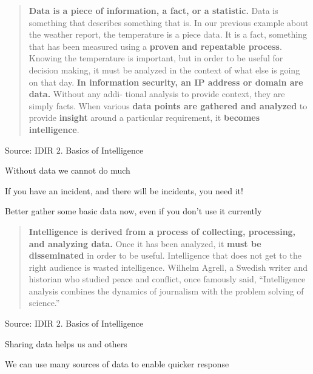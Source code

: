 \documentclass[Screen16to9,17pt]{foils}
\begin{document}

\begin{quote}{\bf
Data is a piece of information, a fact, or a statistic.} Data is something that describes
something that is. In our previous example about the weather report, the temperature
is a piece data. It is a fact, something that has been measured using a {\bf proven and
repeatable process}. Knowing the temperature is important, but in order to be useful
for decision making, it must be analyzed in the context of what else is going on that
day. {\bf In information security, an IP address or domain are data.} Without any addi‐
tional analysis to provide context, they are simply facts. When various {\bf data points are
gathered and analyzed} to provide {\bf insight} around a particular requirement, it {\bf becomes
intelligence}.
\end{quote}
Source:  IDIR 2. Basics of Intelligence

\begin{list2}
\item Without data we cannot do much
\item If you have an incident, and there will be incidents, you need it!
\item Better gather some basic data now, even if you don't use it currently
\end{list2}

\slide{}


\begin{quote}{\bf
Intelligence is derived from a process of collecting, processing, and analyzing data.}
Once it has been analyzed, it {\bf must be disseminated} in order to be useful. Intelligence
that does not get to the right audience is wasted intelligence. Wilhelm Agrell, a Swedish writer and historian who studied peace and conflict, once famously said, “Intelligence analysis combines the dynamics of journalism with the problem solving of science.”
\end{quote}
Source:  IDIR 2. Basics of Intelligence

\begin{list2}
\item Sharing data helps us and others
\item We can use many sources of data to enable quicker response
\end{list2}


\end{document}
